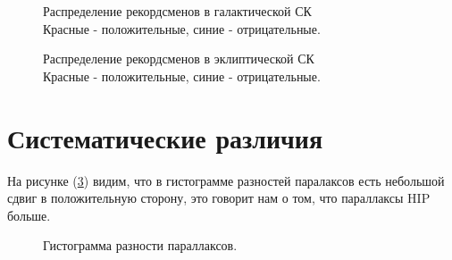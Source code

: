 \documentclass[14pt]{article} %
\begin{document}
\begin{figure}[h!]
\caption{Распределение рекордсменов в галактической СК\\Красные - положительные, синие - отрицательные.}
\label{img:75maxlb}
\end{figure}

\begin{figure}[h!]
\caption{Распределение рекордсменов в эклиптической СК\\Красные - положительные, синие - отрицательные.}
\label{img:75maxlonlat}
\end{figure}

\section{Систематические различия}\label{sistem}
На рисунке (\ref{img:hist_par_deff}) видим, что в гистограмме разностей паралаксов есть небольшой сдвиг в положительную сторону, это говорит нам о том, что параллаксы HIP больше.

\begin{figure}[h!]
\caption{Гистограмма разности параллаксов.}
\label{img:hist_par_deff}
\end{figure}
\end{document}
